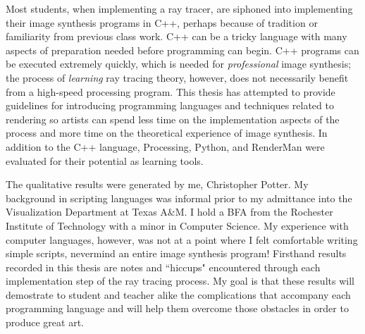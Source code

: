 Most students, when implementing a ray tracer, are siphoned into implementing their image synthesis programs in C++, perhaps because of tradition or familiarity from previous class work.  C++ can be a tricky language with many aspects of preparation needed before programming can begin.  C++ programs can be executed extremely quickly, which is needed for \textit{professional} image synthesis; the process of \textit{learning} ray tracing theory, however, does not necessarily benefit from a high-speed processing program.  This thesis has attempted to provide guidelines for introducing programming languages and techniques related to rendering so artists can spend less time on the implementation aspects of the process and more time on the theoretical experience of image synthesis.  In addition to the C++ language, Processing, Python, and RenderMan were evaluated for their potential as learning tools.

The qualitative results were generated by me, Christopher Potter.  My background in scripting languages was informal prior to my admittance into the Visualization Department at Texas A\&M.  I hold a BFA from the Rochester Institute of Technology with a minor in Computer Science.  My experience with computer languages, however, was not at a point where I felt comfortable writing simple scripts, nevermind an entire image synthesis program!  Firsthand results recorded in this thesis are notes and ``hiccups" encountered through each implementation step of the ray tracing process.  My goal is that these results will demostrate to student and teacher alike the complications that accompany each programming language and will help them overcome those obstacles in order to produce great art.
